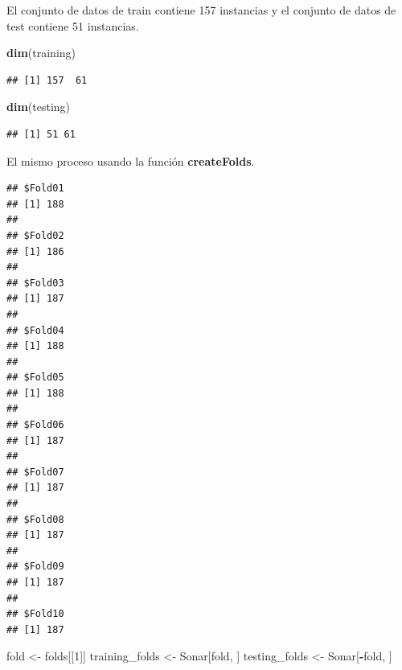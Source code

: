 \documentclass[
]{article}
\newenvironment{Shaded}{\begin{snugshade}}{\end{snugshade}}
\newcommand{\DataTypeTok}[1]{\textcolor[rgb]{0.13,0.29,0.53}{#1}}
\newcommand{\DecValTok}[1]{\textcolor[rgb]{0.00,0.00,0.81}{#1}}
\newcommand{\KeywordTok}[1]{\textcolor[rgb]{0.13,0.29,0.53}{\textbf{#1}}}
\newcommand{\NormalTok}[1]{#1}
\newcommand{\OperatorTok}[1]{\textcolor[rgb]{0.81,0.36,0.00}{\textbf{#1}}}
\newcommand{\OtherTok}[1]{\textcolor[rgb]{0.56,0.35,0.01}{#1}}
\newcommand{\StringTok}[1]{\textcolor[rgb]{0.31,0.60,0.02}{#1}}
\begin{document}
El conjunto de datos de train contiene 157 instancias y el conjunto de
datos de test contiene 51 instancias.

\begin{Shaded}
\begin{Highlighting}[]
\KeywordTok{dim}\NormalTok{(training)}
\end{Highlighting}
\end{Shaded}

\begin{verbatim}
## [1] 157  61
\end{verbatim}

\begin{Shaded}
\begin{Highlighting}[]
\KeywordTok{dim}\NormalTok{(testing)}
\end{Highlighting}
\end{Shaded}

\begin{verbatim}
## [1] 51 61
\end{verbatim}

El mismo proceso usando la función \textbf{createFolds}.

\begin{Shaded}
\end{Shaded}

\begin{verbatim}
## $Fold01
## [1] 188
## 
## $Fold02
## [1] 186
## 
## $Fold03
## [1] 187
## 
## $Fold04
## [1] 188
## 
## $Fold05
## [1] 188
## 
## $Fold06
## [1] 187
## 
## $Fold07
## [1] 187
## 
## $Fold08
## [1] 187
## 
## $Fold09
## [1] 187
## 
## $Fold10
## [1] 187
\end{verbatim}

\begin{Shaded}
\begin{Highlighting}[]
\NormalTok{fold <-}\StringTok{ }\NormalTok{folds[[}\DecValTok{1}\NormalTok{]]}
\NormalTok{training_folds <-}\StringTok{ }\NormalTok{Sonar[fold, ]}
\NormalTok{testing_folds <-}\StringTok{ }\NormalTok{Sonar[}\OperatorTok{-}\NormalTok{fold, ]}
\end{Highlighting}
\end{Shaded}
\end{document}
